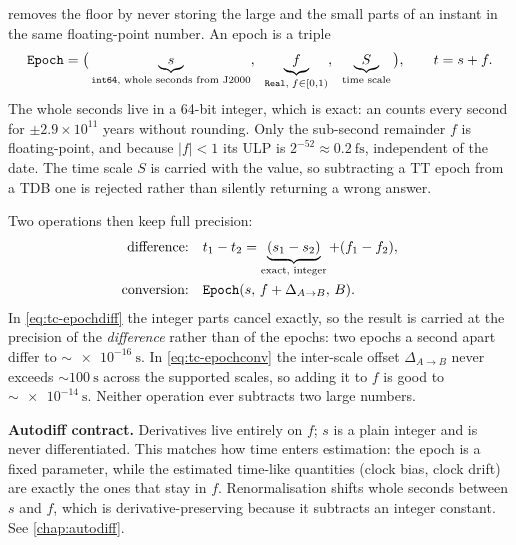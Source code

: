  removes the floor by never storing the large and the small parts
of an instant in the same floating-point number. An epoch is a triple
%
\begin{equation}
\label{eq:tc-epochrep}
  \texttt{Epoch} =
  \bigl(\, \underbrace{s}_{\text{\texttt{int64}, whole seconds from J2000}},\;\;
           \underbrace{f}_{\texttt{Real},\; f \in [0,1)},\;\;
           \underbrace{S}_{\text{time scale}} \,\bigr),
  \qquad t = s + f .
\end{equation}
%
The whole seconds live in a 64-bit integer, which is exact: an 
counts every second for $\pm 2.9\times10^{11}$ years without rounding. Only the
sub-second remainder $f$ is floating-point, and because $|f| < 1$ its ULP is
$2^{-52} \approx \SI{0.2}{\femto\second}$, independent of the date. The time
scale $S$ is carried with the value, so subtracting a TT epoch from a TDB one
is rejected rather than silently returning a wrong answer.

Two operations then keep full precision:
%
\begin{align}
  \label{eq:tc-epochdiff}
  \text{difference:}\quad & t_1 - t_2 = \underbrace{(s_1 - s_2)}_{\text{exact, integer}}
                              + (f_1 - f_2), \\
  \label{eq:tc-epochconv}
  \text{conversion:}\quad & \texttt{Epoch}(s,\, f + \Delta_{A\to B},\, B).
\end{align}
%
In \cref{eq:tc-epochdiff} the integer parts cancel exactly, so the result is
carried at the precision of the \emph{difference} rather than of the epochs:
two epochs a second apart differ to ${\sim}\SI{e-16}{\second}$. In
\cref{eq:tc-epochconv} the inter-scale offset $\Delta_{A\to B}$ never exceeds
${\sim}\SI{100}{\second}$ across the supported scales, so adding it to $f$ is
good to ${\sim}\SI{e-14}{\second}$. Neither operation ever subtracts two large
numbers.

\begin{lupntnote}
\textbf{Autodiff contract.} Derivatives live entirely on $f$; $s$ is a plain
integer and is never differentiated. This matches how time enters estimation:
the epoch is a fixed parameter, while the estimated time-like quantities
(clock bias, clock drift) are exactly the ones that stay in $f$.
Renormalisation shifts whole seconds between $s$ and $f$, which is
derivative-preserving because it subtracts an integer constant. See
\cref{chap:autodiff}.
\end{lupntnote}

